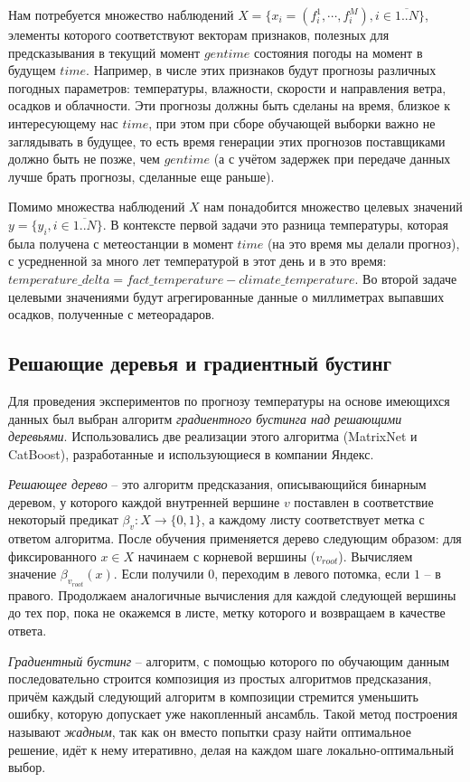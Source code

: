 \documentclass[14pt]{matmex-diploma}
\begin{document}
Нам потребуется множество наблюдений $X = \{x_i = (f^1_{i}, \cdots, f^M_i), i \in \overline{1..N}\}$, элементы которого соответствуют векторам признаков, полезных для предсказывания в текущий момент $gentime$ состояния погоды на момент в будущем $time$. Например, в числе этих признаков будут прогнозы различных погодных параметров: температуры, влажности, скорости и направления ветра, осадков и облачности. Эти прогнозы должны быть сделаны на время, близкое к интересующему нас $time$, при этом при сборе обучающей выборки важно не заглядывать в будущее, то есть время генерации этих прогнозов поставщиками должно быть не позже, чем $gentime$ (а с учётом задержек при передаче данных лучше брать прогнозы, сделанные еще раньше). 

Помимо множества наблюдений $X$ нам понадобится множество целевых значений $y = \{y_i, i \in \overline{1..N}\}$. В контексте первой задачи это разница температуры, которая была получена с метеостанции в момент $time$ (на это время мы делали прогноз), с усредненной за много лет температурой в этот день и в это время: $temperature\_delta = fact\_temperature - climate\_temperature$. Во второй задаче целевыми значениями будут агрегированные данные о миллиметрах выпавших осадков, полученные с метеорадаров.


\subsection{Решающие деревья и градиентный бустинг}

Для проведения экспериментов по прогнозу температуры на основе имеющихся данных был выбран алгоритм \textit{градиентного бустинга над решающими деревьями}. Использовались две реализации этого алгоритма (MatrixNet и CatBoost), разработанные и использующиеся в компании Яндекс.

\textit{Решающее дерево} -- это алгоритм предсказания, описывающийся бинарным деревом, у которого каждой внутренней вершине $v$ поставлен в соответствие некоторый предикат $\beta_v: X \to \{0, 1\}$, а каждому листу соответствует метка с ответом алгоритма\cite{bishop}. После обучения применяется дерево следующим образом: для фиксированного $x \in X$ начинаем с корневой вершины ($v_{root}$). Вычисляем значение $\beta_{v_{root}}(x)$. Если получили $0$, переходим в левого потомка, если $1$ -- в правого. Продолжаем аналогичные вычисления для каждой следующей вершины до тех пор, пока не окажемся в листе, метку которого и возвращаем в качестве ответа.


\textit{Градиентный бустинг} -- алгоритм, с помощью которого по обучающим данным последовательно строится композиция из простых алгоритмов предсказания, причём каждый следующий алгоритм в композиции стремится уменьшить ошибку, которую допускает уже накопленный ансамбль. Такой метод построения называют \textit{жадным}, так как он вместо попытки сразу найти оптимальное решение, идёт к нему итеративно, делая на каждом шаге локально-оптимальный выбор\cite{friedman2001greedy}.
\end{document}
